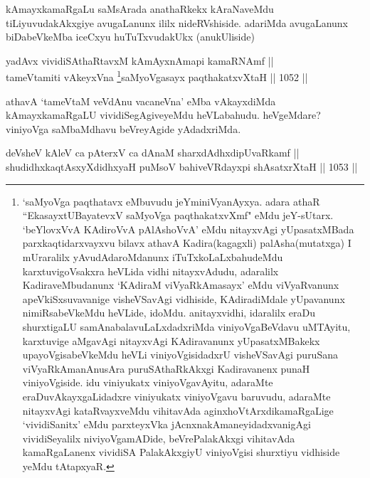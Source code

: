 \begin{artha}
kAmayxkamaRgaLu saMsArada anathaRkekx kAraNaveMdu tiLiyuvudakAkxgiye avugaLanunx ililx nideRVshiside. adariMda avugaLanunx biDabeVkeMba iceCxyu huTuTxvudakUkx (anukUliside)
\end{artha}


\begin{shl}
yadAvx vividiSAthaRtavxM kAmAyxnAmapi kamaRNAmf || \\
tameVtamiti vAkeyxVna \footnote{`saMyoVga paqthatavx eMbuvudu jeYminiVyanAyxya. adara athaR ``EkasayxtUBayatevxV saMyoVga paqthakatxvXmf" eMdu jeY-sUtarx. `beYlovxVvA KAdiroVvA pAlAshoVvA' eMdu nitayxvAgi yUpasatxMBada parxkaqtidarxvayxvu bilavx athavA Kadira(kagagxli) palAsha(mutatxga) I mUraralilx yAvudAdaroMdanunx iTuTxkoLaLxbahudeMdu karxtuvigoVsakxra heVLida vidhi nitayxvAdudu, adaralilx KadiraveMbudanunx `KAdiraM viVyaRkAmasayx' eMdu viVyaRvanunx apeVkiSxsuvavanige visheVSavAgi vidhiside, KAdiradiMdale yUpavanunx nimiRsabeVkeMdu heVLide, idoMdu. anitayxvidhi, idaralilx eraDu shurxtigaLU samAnabalavuLaLxdadxriMda viniyoVgaBeVdavu uMTAyitu, karxtuvige aMgavAgi nitayxvAgi KAdiravanunx yUpasatxMBakekx upayoVgisabeVkeMdu heVLi viniyoVgisidadxrU visheVSavAgi puruSana viVyaRkAmanAnusAra puruSAthaRkAkxgi Kadiravanenx punaH viniyoVgiside. idu viniyukatx viniyoVgavAyitu, adaraMte eraDuvAkayxgaLidadxre viniyukatx viniyoVgavu baruvudu, adaraMte nitayxvAgi kataRvayxveMdu vihitavAda aginxhoVtArxdikamaRgaLige `vividiSanitx' eMdu parxteyxVka jAcnxnakAmaneyidadxvanigAgi vividiSeyalilx niviyoVgamADide, beVrePalakAkxgi vihitavAda kamaRgaLanenx vividiSA PalakAkxgiyU viniyoVgisi shurxtiyu vidhiside yeMdu tAtapxyaR.}saMyoVgasayx paqthakatxvXtaH \hfill || 1052 ||  
\end{shl}


\begin{artha}
athavA `tameVtaM veVdAnu vacaneVna' eMba vAkayxdiMda kAmayxkamaRgaLU vividiSegAgiveyeMdu heVLabahudu. heVgeMdare? viniyoVga saMbaMdhavu beVreyAgide yAdadxriMda.
\end{artha}


\begin{shl}
deVsheV kAleV ca pAterxV ca dAnaM sharxdAdhxdipUvaRkamf || \\
shudidhxkaqtAsxyXdidhxyaH puMsoV bahiveVRdayxpi shAsatxrXtaH \hfill || 1053 ||  
\end{shl}

